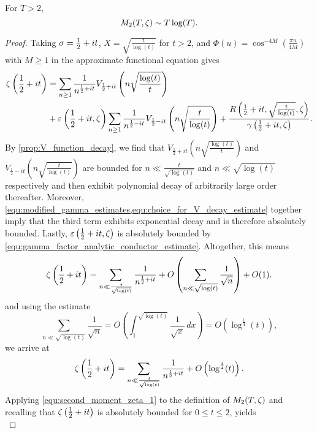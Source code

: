     \begin{theorem}
      For $T > 2$,
      \[
        M_{2}(T,\zeta) \sim T\log(T).
      \]
    \end{theorem}
    \begin{proof}
      Taking $\sigma = \frac{1}{2}+it$, $X = \sqrt{\frac{t}{\log(t)}}$ for $t > 2$, and $\Phi(u) = \cos^{-4M}\left(\frac{\pi u}{4M}\right)$ with $M \ge 1$ in the approximate functional equation gives
      \begin{align*}
        \zeta\left(\frac{1}{2}+it\right) &= \sum_{n \ge 1}\frac{1}{n^{\frac{1}{2}+it}}V_{\frac{1}{2}+it}\left(n\sqrt{\frac{\log(t)}{t}}\right) \\
        &+ \varepsilon\left(\frac{1}{2}+it,\zeta\right)\sum_{n \ge 1}\frac{1}{n^{\frac{1}{2}-it}}V_{\frac{1}{2}-it}\left(n\sqrt{\frac{t}{\log(t)}}\right)+\frac{R\left(\frac{1}{2}+it,\sqrt{\frac{t}{\log(t)}},\zeta\right)}{\gamma\left(\frac{1}{2}+it,\zeta\right)}.
      \end{align*}
      By \cref{prop:V_function_decay}, we find that $V_{\frac{1}{2}+it}\left(n\sqrt{\frac{\log(t)}{t}}\right)$ and $V_{\frac{1}{2}-it}\left(n\sqrt{\frac{t}{\log(t)}}\right)$ are bounded for $n \ll \frac{t}{\sqrt{\log(t)}}$ and $n \ll \sqrt{\log(t)}$ respectively and then exhibit polynomial decay of arbitrarily large order thereafter. Moreover, \cref{equ:modified_gamma_estimates,equ:choice_for_V_decay_estimate} together imply that the third term exhibits exponential decay and is therefore absolutely bounded. Lastly, $\varepsilon\left(\frac{1}{2}+it,\zeta\right)$ is absolutely bounded by \cref{equ:gamma_factor_analytic_conductor_estimate}. Altogether, this means
      \[
        \zeta\left(\frac{1}{2}+it\right) = \sum_{n \ll \frac{t}{\sqrt{\log(t)}}}\frac{1}{n^{\frac{1}{2}+it}}+O\left(\sum_{n \ll \sqrt{\log(t)}}\frac{1}{\sqrt{n}}\right)+O(1).
      \]
      and using the estimate
      \[
        \sum_{n \ll \sqrt{\log(t)}}\frac{1}{\sqrt{n}} = O\left(\int_{1}^{\sqrt{\log(t)}}\frac{1}{\sqrt{x}}\,dx\right) = O\left(\log^{\frac{1}{4}}(t)\right),
      \]
      we arrive at
      \begin{equation}\label{equ:second_moment_zeta_1}
        \zeta\left(\frac{1}{2}+it\right) = \sum_{n \ll \frac{t}{\sqrt{\log(t)}}}\frac{1}{n^{\frac{1}{2}+it}}+O\left(\log^{\frac{1}{4}}(t)\right).
      \end{equation}
      Applying \cref{equ:second_moment_zeta_1} to the definition of $M_{2}(T,\zeta)$ and recalling that $\zeta\left(\frac{1}{2}+it\right)$ is absolutely bounded for $0 \le t \le 2$, yields
      \begin{equation}\label{equ:second_moment_zeta_2}

\end{equation}
\end{proof}
